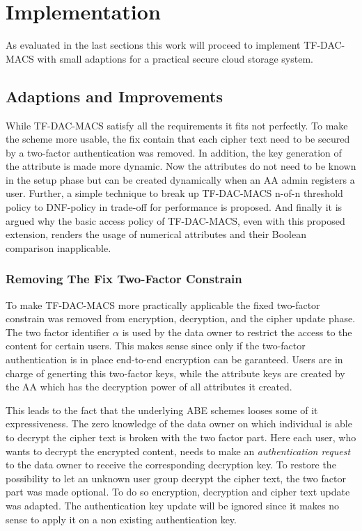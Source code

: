 \chapter{Implementation}
As evaluated in the last sections this work will proceed to implement TF-DAC-MACS \cite{li2017two} with small adaptions for a practical secure cloud storage system. 

\section{Adaptions and Improvements}
While TF-DAC-MACS satisfy all the requirements it fits not perfectly. To make the scheme more usable, the fix contain that each cipher text need to be secured by a two-factor authentication was removed. In addition, the key generation of the attribute is made more dynamic. Now the attributes do not need to be known in the setup phase but can be created dynamically when an AA admin registers a user. Further, a simple technique to break up TF-DAC-MACS n-of-n threshold policy to DNF-policy in trade-off for performance is proposed. And finally it is argued why the basic access policy of TF-DAC-MACS, even with this proposed extension, renders the usage of numerical attributes and their Boolean comparison inapplicable.

\subsection{Removing The Fix Two-Factor Constrain}
\label{sec:removing-the-fix-two-factor-constrain}
To make \ac{TF-DAC-MACS} more practically applicable the fixed two-factor constrain was removed from encryption, decryption, and the cipher update phase. The two factor identifier $\alpha$ is used by the data owner to restrict the access to the content for certain users. This makes sense since only if the two-factor authentication is in place end-to-end encryption can be garanteed. Users are in charge of generting this two-factor keys, while the attribute keys are created by the AA which has the decryption power of all attributes it created.

This leads to the fact that the underlying \ac{ABE} schemes looses some of it expressiveness. The zero knowledge of the data owner on which individual is able to decrypt the cipher text is broken with the two factor part. Here each user, who wants to decrypt the encrypted content, needs to make an \textit{authentication request} to the data owner to receive the corresponding decryption key. To restore the possibility to let an unknown user group decrypt the cipher text, the two factor part was made optional. To do so encryption, decryption and cipher text update was adapted. The authentication key update will be ignored since it makes no sense to apply it on a non existing authentication key. 

